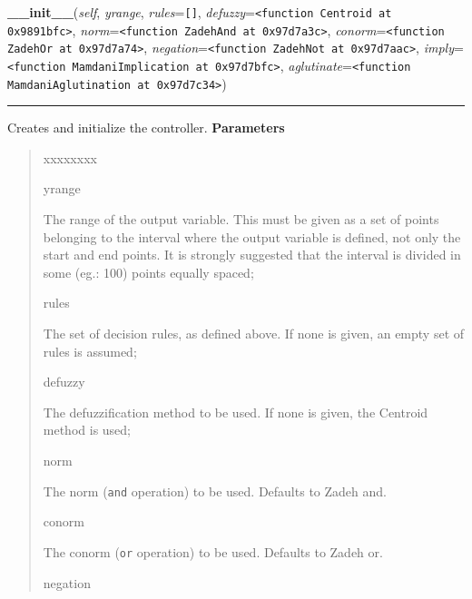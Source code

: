     \vspace{0.5ex}

\hspace{.8\funcindent}\begin{boxedminipage}{\funcwidth}

    \raggedright \textbf{\_\_init\_\_}(\textit{self}, \textit{yrange}, \textit{rules}={\tt \texttt{[}\texttt{]}}, \textit{defuzzy}={\tt {\textless}function Centroid at 0x9891bfc{\textgreater}}, \textit{norm}={\tt {\textless}function ZadehAnd at 0x97d7a3c{\textgreater}}, \textit{conorm}={\tt {\textless}function ZadehOr at 0x97d7a74{\textgreater}}, \textit{negation}={\tt {\textless}function ZadehNot at 0x97d7aac{\textgreater}}, \textit{imply}={\tt {\textless}function MamdaniImplication at 0x97d7bfc{\textgreater}}, \textit{aglutinate}={\tt {\textless}function MamdaniAglutination at 0x97d7c34{\textgreater}})

    \vspace{-1.5ex}

    \rule{\textwidth}{0.5\fboxrule}
\setlength{\parskip}{2ex}

Creates and initialize the controller.
\setlength{\parskip}{1ex}
      \textbf{Parameters}
      \vspace{-1ex}

      \begin{quote}
        \begin{Ventry}{xxxxxxxx}

          \item[yrange]


The range of the output variable. This must be given as a set of
points belonging to the interval where the output variable is
defined, not only the start and end points. It is strongly suggested
that the interval is divided in some (eg.: 100) points equally
spaced;
          \item[rules]


The set of decision rules, as defined above. If none is given, an
empty set of rules is assumed;
          \item[defuzzy]


The defuzzification method to be used. If none is given, the
Centroid method is used;
          \item[norm]


The norm (\texttt{and} operation) to be used. Defaults to Zadeh and.
          \item[conorm]


The conorm (\texttt{or} operation) to be used. Defaults to Zadeh or.
          \item[negation]



\end{Ventry}
\end{quote}
\end{boxedminipage}
